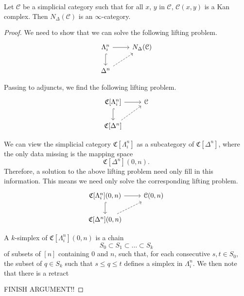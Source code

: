 \begin{proposition}
	\label{prop:simplicial_nerve_of_category_enriched_in_kan_complexes_gives_infinity_category}
	Let $\mathcal{C}$ be a simplicial category such that for all $x$, $y$ in $\mathcal{C}$, $\mathcal{C}(x, y)$ is a Kan complex. Then $N_{\Delta}( \mathcal{C} )$ is an $\infty$-category.
\end{proposition}
\begin{proof}
	We need to show that we can solve the following lifting problem.
	\begin{equation*}
	\begin{tikzcd}
	\Lambda^{n}_{i}
	\arrow[r]
	\arrow[d, hookrightarrow]
	& N_{\Delta}(\mathcal{C})
	\\
	\Delta^{n}
	\arrow[ur, dashed]
	\end{tikzcd}
	\end{equation*}
	
	Passing to adjuncts, we find the following lifting problem.
	\begin{equation*}
	\begin{tikzcd}
	\mathfrak{C}[\Lambda^{n}_{i}]
	\arrow[r]
	\arrow[d, hookrightarrow]
	& \mathcal{C}
	\\
	\mathfrak{C}[\Delta^{n}]
	\arrow[ur, dashed]
	\end{tikzcd}
	\end{equation*}
	
	We can view the simplicial category $\mathfrak{C}[\Lambda^{n}_{i}]$ as a subcategory of $\mathfrak{C}[\Delta^{n}]$, where the only data missing is the mapping space
	\begin{equation*}
	\mathfrak{C}[\Delta^{n}](0, n).
	\end{equation*}
	Therefore, a solution to the above lifting problem need only fill in this information. This means we need only solve the corresponding lifting problem.
	\begin{equation*}
	\begin{tikzcd}
	\mathfrak{C}[\Lambda^{n}_{i}](0, n)
	\arrow[r]
	\arrow[d, hookrightarrow]
	& \mathcal{C}(0, n)
	\\
	\mathfrak{C}[\Delta^{n}](0, n)
	\arrow[ur, dashed]
	\end{tikzcd}
	\end{equation*}
	
	A $k$-simplex of $\mathfrak{C}[\Lambda^{n}_{i}](0, n)$ is a chain 
	\[
	S_0\subset S_1\subset\ldots\subset S_k
	\]
	of subsets of $[n]$ containing $0$ and $n$, such that, for each consecutive $s,t\in S_0$, the subset of $q\in S_k$ such that $s\leq q\leq t$ defines a simplex in $\Lambda^n_i$. We then note that there is a retract 
	
	FINISH ARGUMENT!!
\end{proof}

